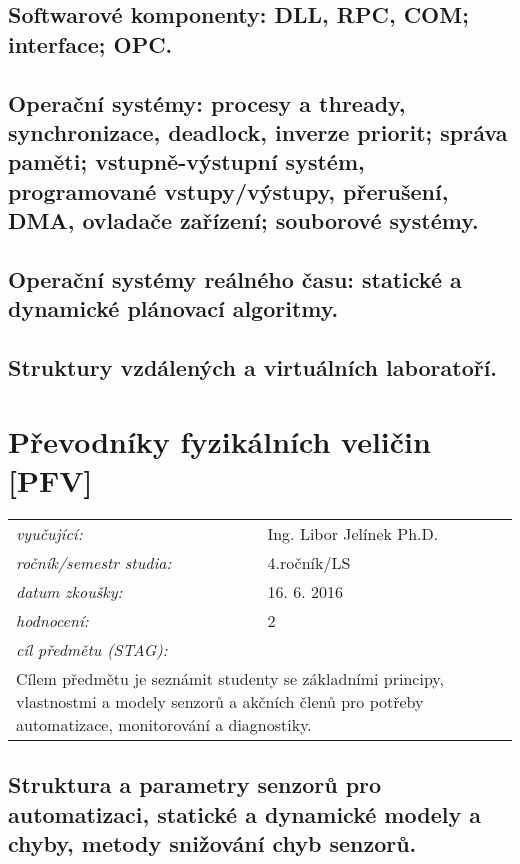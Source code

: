 \subsection{Softwarové komponenty: DLL, RPC, COM; interface; OPC.}

\subsection{Operační systémy: procesy a thready, synchronizace, deadlock, inverze priorit; správa paměti; vstupně-výstupní systém, programované vstupy/výstupy, přerušení, DMA, ovladače zařízení; souborové systémy.}

\subsection{Operační systémy reálného času: statické a dynamické plánovací algoritmy.}

\subsection{Struktury vzdálených a virtuálních laboratoří.}

\newpage
\section{Převodníky fyzikálních veličin [PFV]}

\begin{table}[H]
\centering
\begin{tabular}{p{4cm} p{12cm}}
\textit{vyučující:}             & Ing. Libor Jelínek Ph.D. \\
\textit{ročník/semestr studia:} & 4.ročník/LS \\
\textit{datum zkoušky:}         & 16. 6. 2016 \\
\textit{hodnocení:}             & 2 \\
\textit{cíl předmětu (STAG):}   & \\
\multicolumn{2}{p{16cm}}{Cílem předmětu je seznámit studenty se základními principy, vlastnostmi a modely senzorů a akčních členů pro potřeby automatizace, monitorování a diagnostiky.}
\end{tabular}
\end{table}

\subsection{Struktura a parametry senzorů pro automatizaci, statické a dynamické modely a chyby, metody snižování chyb senzorů.}

